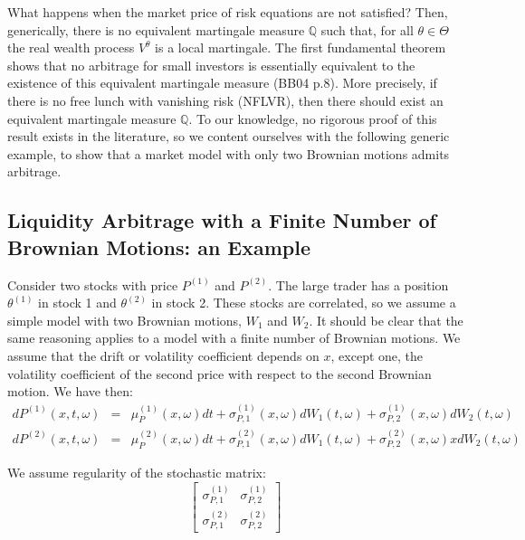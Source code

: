 \documentclass{article}
\begin{document}
\bigskip

What happens when the market price of risk equations are not satisfied?
Then, generically, there is no equivalent martingale measure $\mathbb{Q}$
such that, for all $\theta \in \Theta $ the real wealth process $V^{\theta }$
is a local martingale. The first fundamental theorem shows that no arbitrage
for small investors is essentially equivalent to the existence of this
equivalent martingale measure (BB04 p.8). More precisely, if there is no
free lunch with vanishing risk (NFLVR), then there should exist an
equivalent martingale measure $\mathbb{Q}$. To our knowledge, no rigorous
proof of this result exists in the literature, so we content ourselves with
the following generic example, to show that a market model with only two
Brownian motions admits arbitrage.

\bigskip

\subsection{Liquidity Arbitrage with a Finite Number of Brownian Motions: an
Example}

Consider two stocks with price $P^{(1)}$ and $P^{(2)}$. The large trader has
a position $\theta ^{(1)}$ in stock 1 and $\theta ^{(2)}$ in stock 2. These
stocks are correlated, so we assume a simple model with two Brownian
motions, $W_{1}$ and $W_{2}$. It should be clear that the same reasoning
applies to a model with a finite number of Brownian motions. We assume that
the drift or volatility coefficient depends on $x$, except one, the
volatility coefficient of the second price with respect to the second
Brownian motion. We have then:%
\begin{eqnarray*}
dP^{(1)}(x,t,\omega ) &=&\mu _{P}^{(1)}(x,\omega )dt+\sigma
_{P,1}^{(1)}(x,\omega )dW_{1}(t,\omega )+\sigma _{P,2}^{(1)}(x,\omega
)dW_{2}(t,\omega ) \\
dP^{(2)}(x,t,\omega ) &=&\mu _{P}^{(2)}(x,\omega )dt+\sigma
_{P,1}^{(2)}(x,\omega )dW_{1}(t,\omega )+\sigma _{P,2}^{(2)}(x,\omega
)xdW_{2}(t,\omega )
\end{eqnarray*}

We assume regularity of the stochastic matrix:
\begin{equation*}
\left[
\begin{array}{cc}
\sigma _{P,1}^{(1)} & \sigma _{P,2}^{(1)} \\
\sigma _{P,1}^{(2)} & \sigma _{P,2}^{(2)}%
\end{array}%
\right]
\end{equation*}
\end{document}
